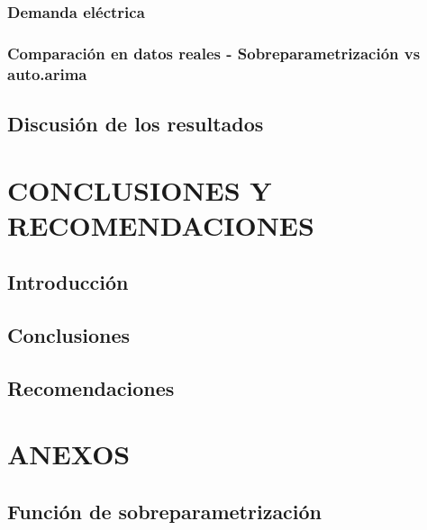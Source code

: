 \documentclass[
]{article}
\begin{document}
\subsubsection{Demanda eléctrica}

\subsubsection{Comparación en datos reales - Sobreparametrización vs auto.arima}

\subsection{Discusión de los resultados}

\newpage

\section{CONCLUSIONES Y RECOMENDACIONES}

\subsection{Introducción}

\subsection{Conclusiones}

\subsection{Recomendaciones}

\newpage

\section{ANEXOS}

\subsection{Función de sobreparametrización}

\label{funcion_op_arima}
\end{document}

